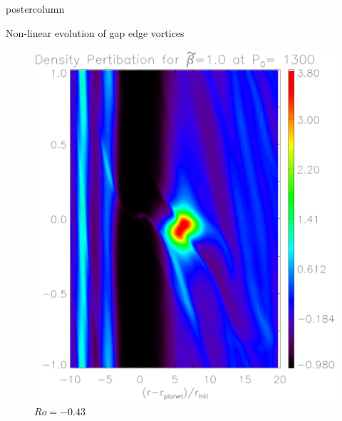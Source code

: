 \documentclass[final,hyperref={pdfpagelabels=false}]{beamer}
\begin{document}
\begin{frame}
\begin{columns}
\begin{column}{.49\textwidth}
\begin{beamercolorbox}[center,wd=\textwidth]{postercolumn}
\begin{minipage}[T]{.95\textwidth}
{\begin{block}{\Large{Non-linear evolution of gap edge
                  vortices}}
\begin{figure}
\begin{minipage}{0.3\textwidth}
                      \includegraphics[width=\textwidth]{Posterfig_During}
                      \caption{$Ro=-0.43$}
                    \end{minipage}
                    \hfill
                    \begin{minipage}{0.3\textwidth}

\end{minipage}
\end{figure}
\end{block}}
\end{minipage}
\end{beamercolorbox}
\end{column}
\end{columns}
\end{frame}
\end{document}
